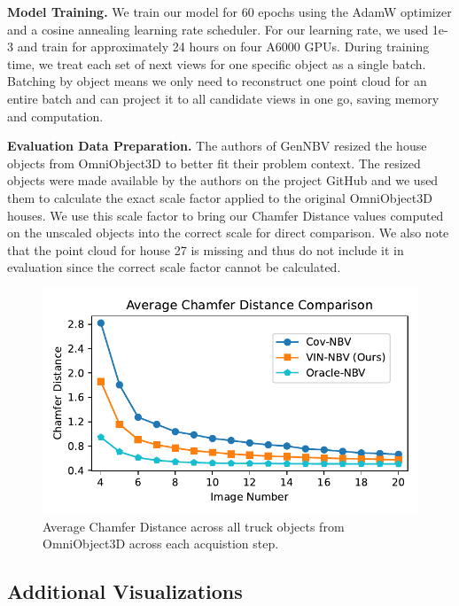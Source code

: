 \noindent\textbf{Model Training.} We train our model for 60 epochs using the AdamW\cite{loshchilov2019decoupledweightdecayregularization} optimizer and a cosine annealing\cite{loshchilov2017sgdrstochasticgradientdescent} learning rate scheduler. For our learning rate, we used 1e-3 and train for approximately 24 hours on four A6000 GPUs. During training time, we treat each set of next views for one specific object as a single batch. Batching by object means we only need to reconstruct one point cloud for an entire batch and can project it to all candidate views in one go, saving memory and computation.

\noindent\textbf{Evaluation Data Preparation.} The authors of GenNBV \cite{chen2024gennbv} resized the house objects from OmniObject3D \cite{wu2023omniobject3d} to better fit their problem context. The resized objects were made available by the authors on the project GitHub and we used them to calculate the exact scale factor applied to the original OmniObject3D \cite{wu2023omniobject3d} houses. We use this scale factor to bring our Chamfer Distance values computed on the unscaled objects into the correct scale for direct comparison. We also note that the point cloud for house 27 is missing and thus do not include it in evaluation since the correct scale factor cannot be calculated.

\begin{figure}[H]
  \centering
  \includegraphics[width=0.96\columnwidth]{Figures/truck_combined_chamfer.pdf}
    \caption{Average Chamfer Distance across all truck objects from OmniObject3D \cite{wu2023omniobject3d} across each acquistion step.}
    \label{fig:truck_chamfer}
    \vspace{0.5em}
\end{figure}

\subsection{Additional Visualizations}
\label{sec:additional_visuals}

